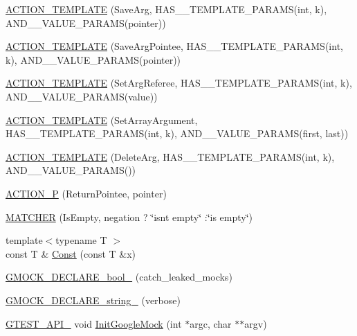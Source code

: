 \begin{DoxyCompactItemize}
\hyperlink{namespacetesting_a0478a3464d31f6726d5bc47b1be46491}{A\+C\+T\+I\+O\+N\+\_\+\+T\+E\+M\+P\+L\+A\+TE} (Save\+Arg, H\+A\+S\+\_\+\_\+\+T\+E\+M\+P\+L\+A\+T\+E\+\_\+\+P\+A\+R\+A\+MS(int, k), A\+N\+D\+\_\+\_\+\+V\+A\+L\+U\+E\+\_\+\+P\+A\+R\+A\+MS(pointer))
\item 
\hyperlink{namespacetesting_a31565a90ad7f08c1a88e4b138957172c}{A\+C\+T\+I\+O\+N\+\_\+\+T\+E\+M\+P\+L\+A\+TE} (Save\+Arg\+Pointee, H\+A\+S\+\_\+\_\+\+T\+E\+M\+P\+L\+A\+T\+E\+\_\+\+P\+A\+R\+A\+MS(int, k), A\+N\+D\+\_\+\_\+\+V\+A\+L\+U\+E\+\_\+\+P\+A\+R\+A\+MS(pointer))
\item 
\hyperlink{namespacetesting_adfd3c9538285d257370f955aa81488f1}{A\+C\+T\+I\+O\+N\+\_\+\+T\+E\+M\+P\+L\+A\+TE} (Set\+Arg\+Referee, H\+A\+S\+\_\+\_\+\+T\+E\+M\+P\+L\+A\+T\+E\+\_\+\+P\+A\+R\+A\+MS(int, k), A\+N\+D\+\_\+\_\+\+V\+A\+L\+U\+E\+\_\+\+P\+A\+R\+A\+MS(value))
\item 
\hyperlink{namespacetesting_a2b0f090219db3bb0630d5ce6f7d911d8}{A\+C\+T\+I\+O\+N\+\_\+\+T\+E\+M\+P\+L\+A\+TE} (Set\+Array\+Argument, H\+A\+S\+\_\+\_\+\+T\+E\+M\+P\+L\+A\+T\+E\+\_\+\+P\+A\+R\+A\+MS(int, k), A\+N\+D\+\_\+\_\+\+V\+A\+L\+U\+E\+\_\+\+P\+A\+R\+A\+MS(first, last))
\item 
\hyperlink{namespacetesting_a37a5ebfe68fd8dedf8bd82a5ebddcb7b}{A\+C\+T\+I\+O\+N\+\_\+\+T\+E\+M\+P\+L\+A\+TE} (Delete\+Arg, H\+A\+S\+\_\+\_\+\+T\+E\+M\+P\+L\+A\+T\+E\+\_\+\+P\+A\+R\+A\+MS(int, k), A\+N\+D\+\_\+\_\+\+V\+A\+L\+U\+E\+\_\+\+P\+A\+R\+A\+MS())
\item 
\hyperlink{namespacetesting_a3d58f0d746946064154cd257d368599d}{A\+C\+T\+I\+O\+N\+\_\+P} (Return\+Pointee, pointer)
\item 
\hyperlink{namespacetesting_a4fcb3f407119590471bea5a90a8d2dda}{M\+A\+T\+C\+H\+ER} (Is\+Empty, negation ? \char`\"{}isn\textquotesingle{}t empty\char`\"{} \+:\char`\"{}is empty\char`\"{})
\item 
{\footnotesize template$<$typename T $>$ }\\const T \& \hyperlink{namespacetesting_a945ac56c5508a3c9c032bbe8aae8dcfa}{Const} (const T \&x)
\item 
\hyperlink{namespacetesting_a9dd7591091234b86ce48ce1aff6feeb5}{G\+M\+O\+C\+K\+\_\+\+D\+E\+C\+L\+A\+R\+E\+\_\+bool\+\_\+} (catch\+\_\+leaked\+\_\+mocks)
\item 
\hyperlink{namespacetesting_a4dd099d1d538f26a16fcc2f94011b37e}{G\+M\+O\+C\+K\+\_\+\+D\+E\+C\+L\+A\+R\+E\+\_\+string\+\_\+} (verbose)
\item 
\hyperlink{gtest-port_8h_aa73be6f0ba4a7456180a94904ce17790}{G\+T\+E\+S\+T\+\_\+\+A\+P\+I\+\_\+} void \hyperlink{namespacetesting_a32b1c6db9ba5133ccabfa67616b3c041}{Init\+Google\+Mock} (int $\ast$argc, char $\ast$$\ast$argv)
$$
\end{DoxyCompactItemize}
